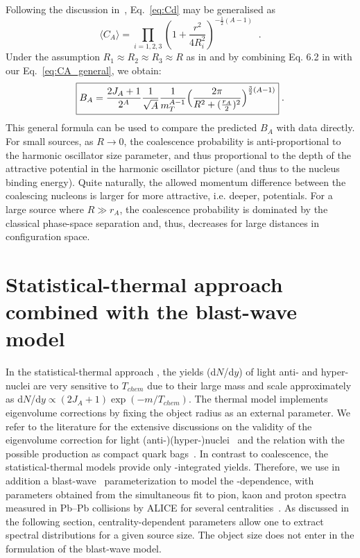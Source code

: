 \documentclass[%
 reprint,
 amsmath,amssymb,
 aps,
]{revtex4-1}
\begin{document}
Following the discussion in~\cite{Scheibl:1998tk, Blum:2017qnn}, Eq.~\ref{eq:Cd} may be generalised as 
%
\begin{equation}
\langle C_{A} \rangle = \prod_{i=1,2,3} \left(1 + \frac{r^2}{4R_{i}^2} \right)^{-\frac{1}{2}(A-1)} \;\; .
\label{eq:CA_general}
\end{equation}
%
Under the assumption $R_1\approx R_2 \approx R_3 \approx R$ as in \cite{Blum:2017qnn} and by combining Eq. 6.2 in \cite{Scheibl:1998tk} with our Eq.~\ref{eq:CA_general}, 
we obtain:
%
\begin{equation}\label{eq:master}
	\boxed {  B_{A} = {2J_{A} + 1 \over 2^{A}} {1 \over \sqrt{A}} {1 \over m_{T}^{A-1}} \Bigl({2\pi \over R^2 + ({r_A \over 2})^2 }\Bigr)^{\frac{3}{2}(A-1)} } \;.
\end{equation}
%
This general formula can be used to compare the predicted $B_{A}$ with data directly.
For small sources, as $R \rightarrow 0$, the coalescence probability is anti-proportional to the harmonic oscillator size parameter, and thus proportional to the depth of the attractive potential in the harmonic oscillator picture (and thus to the nucleus binding energy).
Quite naturally, the allowed momentum difference between the coalescing nucleons is larger for more attractive, i.e. deeper, potentials. 
For a large source where $R \gg r_A$, the coalescence probability is dominated by the classical phase-space separation and, thus, decreases for large distances in configuration space. 
%

\section{Statistical-thermal approach combined with the blast-wave model}\label{sec:thermal}
In the statistical-thermal approach \cite{Petran:2013dva,Wheaton:2004qb,Andronic:2005yp}, the yields (d$N$/d$y$) of light anti- and hyper-nuclei are very sensitive to $T_{chem}$ due to their large mass and scale approximately as d$N$/d$y \propto (2J_{A} + 1)\exp(-m/T_{chem})$. 
The thermal model implements eigenvolume corrections by fixing the object radius as an external parameter.
We refer to the literature for the extensive discussions on the validity of the eigenvolume correction for light \mbox{(anti-)(hyper-)}nuclei~\cite{Vovchenko:2016mwg} and the relation with the possible production as compact quark bags~\cite{Andronic:2017}.
In contrast to coalescence, the statistical-thermal models provide only \pt-integrated yields. 
Therefore, we use in addition a blast-wave~\cite{Schnedermann:1993ws} parameterization to model the \pt-dependence, with parameters obtained from the simultaneous fit to pion, kaon and proton spectra measured in Pb--Pb collisions by ALICE for several centralities~\cite{Abelev:2013vea}.  
 As discussed in the following section, centrality-dependent parameters allow one to extract spectral distributions for a given source size. 
The object size does not enter in the formulation of the blast-wave model.
\end{document}
